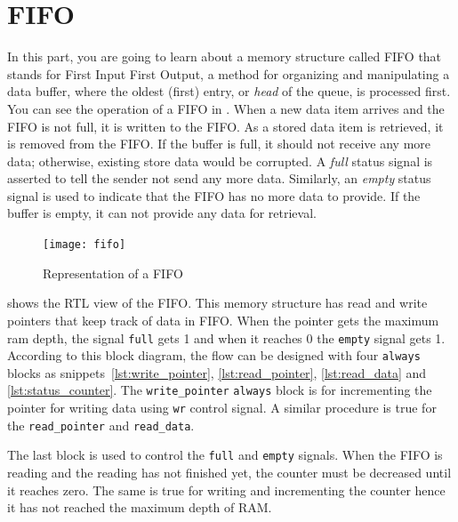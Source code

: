 \documentclass[12pt, logo=tehranDLDL/ut]{tehranDLDL}
\begin{document}
\section{FIFO\label{sec:fifo}}

In this part, you are going to learn about a memory structure called FIFO that stands for First Input First Output, a method for organizing and manipulating a data buffer, where the oldest (first) entry, or \textit{head} of the queue, is processed first. You can see the operation of a FIFO in .
When a new data item arrives and the FIFO is not full, it is written to the FIFO. As a stored data item is retrieved, it is removed from the FIFO. If the buffer is full, it should not receive any more data; otherwise, existing store data would be corrupted. A \textit{full} status signal is asserted to tell the sender not send any more data. Similarly, an \textit{empty} status signal is used to indicate that the FIFO has no more data to provide. If the buffer is empty, it can not provide any data for retrieval.

\begin{figure}
    \centering
    \caption{Representation of a FIFO\label{fig:fifo}}
    \texttt{[image: fifo]}
\end{figure}

 shows the RTL view of the FIFO. This memory structure has read and write pointers that keep track of data in FIFO. When the pointer gets the maximum ram depth, the signal \lstinline{full} gets 1 and when it reaches 0 the \lstinline{empty} signal gets 1.
According to this block diagram, the flow can be designed with four \lstinline{always} blocks as snippets~\ref{lst:write_pointer}, \ref{lst:read_pointer}, \ref{lst:read_data} and \ref{lst:status_counter}.
The \lstinline{write_pointer} \lstinline{always} block is for incrementing the pointer for writing data using \lstinline{wr} control signal. A similar procedure is true for the \lstinline{read_pointer} and \lstinline{read_data}.

The last block is used to control the \lstinline{full} and \lstinline{empty} signals. When the FIFO is reading and the reading has not finished yet, the counter must be decreased until it reaches zero. The same is true for writing and incrementing the counter hence it has not reached the maximum depth of RAM.
\end{document}
